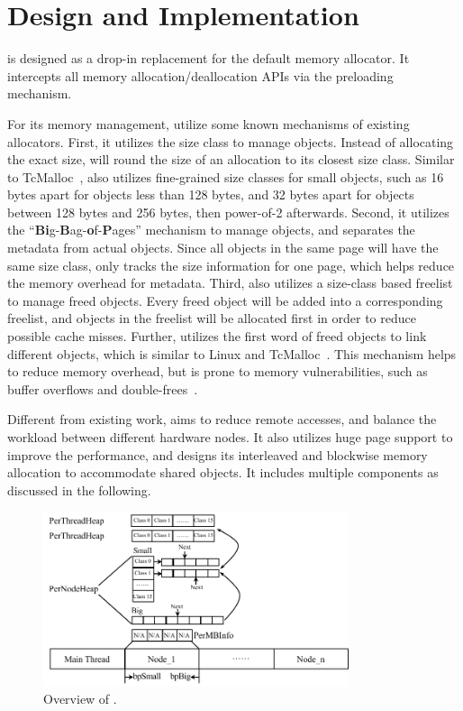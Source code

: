 \section{Design and Implementation}
\label{sec:implement}

\NM{} is designed as a drop-in replacement for the default memory allocator. It intercepts all memory allocation/deallocation APIs via the preloading mechanism. 

For its memory management, \NA{} utilize some known mechanisms of existing allocators. First, it utilizes the size class to manage objects. Instead of allocating the exact size, \NA{} will round the size of an allocation to its closest size class. Similar to TcMalloc~\cite{tcmalloc}, \NA{} also utilizes fine-grained size classes for small objects, such as 16 bytes apart for objects less than 128 bytes, and 32 bytes apart for objects between 128 bytes and 256 bytes, then power-of-2 afterwards. Second, it utilizes the ``\textbf{Bi}g-\textbf{B}ag-\textbf{o}f-\textbf{P}ages'' mechanism to manage objects, and separates the metadata from actual objects. Since all objects in the same page will have the same size class, \NA{} only tracks the size information for one page, which helps reduce the memory overhead for metadata. Third, \NA{} also utilizes a size-class based freelist to manage freed objects. Every freed object will be added into a corresponding freelist, and objects in the freelist will be allocated first in order to reduce possible cache misses. Further, \NA{} utilizes the first word of freed objects to link different objects, which is similar to Linux and TcMalloc~\cite{tcmalloc}. This mechanism helps to reduce memory overhead, but is prone to memory vulnerabilities, such as buffer overflows and double-frees~\cite{Guarder}.     


Different from existing work, \NA{} aims to reduce remote accesses, and balance the workload between different hardware nodes. It also utilizes huge page support to improve the performance, and designs its interleaved and blockwise memory allocation to accommodate shared objects. It includes multiple components as discussed in the following. 

\begin{figure}[h]
\begin{center}
\includegraphics[width=0.8\textwidth]{figure/heaplayout}
\end{center}
\vspace{-0.1in}
\caption{Overview of \NA{}.
\label{fig:overview}}
\vspace{-0.1in}
\end{figure}

